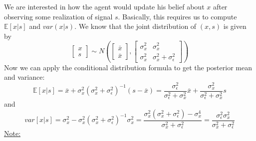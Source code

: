 \documentclass[12pt]{article}
\begin{document}
We are interested in how the agent would update his belief about $x$ after observing some realization of signal $s$. Basically, this requires us to compute $\mathbb{E}[x|s]$ and $var(x|s)$. We know that the joint distribution of $(x,s)$ is given by
\begin{equation}
	\begin{bmatrix}
		x \\ s
	\end{bmatrix} \sim N\left(\begin{bmatrix}
	\bar{x} \\ \bar{x}
\end{bmatrix}, \begin{bmatrix}
\sigma^2_x & \sigma^2_x \\
\sigma^2_x & \sigma^2_x + \sigma^2_\epsilon
\end{bmatrix}\right)
\end{equation}
Now we can apply the conditional distribution formula to get the posterior mean and variance:
\begin{equation} \label{eq:posterior_mean}
	\mathbb{E}[x|s] = \bar{x} + \sigma^2_x (\sigma^2_x + \sigma^2_\epsilon)^{-1} (s - \bar{x}) = \frac{\sigma_\epsilon^2}{\sigma^2_\epsilon + \sigma^2_x} \bar{x} + \frac{\sigma_x^2}{\sigma^2_\epsilon + \sigma^2_x} s
\end{equation}
and
\begin{equation} \label{eq:posterior_var}
	var[x|s] = \sigma^2_x - \sigma^2_x (\sigma^2_x + \sigma^2_\epsilon)^{-1} \sigma^2_x = \frac{\sigma^2_x(\sigma^2_x + \sigma^2_\epsilon) - \sigma^4_x}{\sigma^2_x + \sigma^2_\epsilon} = \frac{\sigma^2_\epsilon \sigma^2_x}{\sigma^2_x + \sigma^2_\epsilon}
\end{equation}
\underline{Note:}
\end{document}
